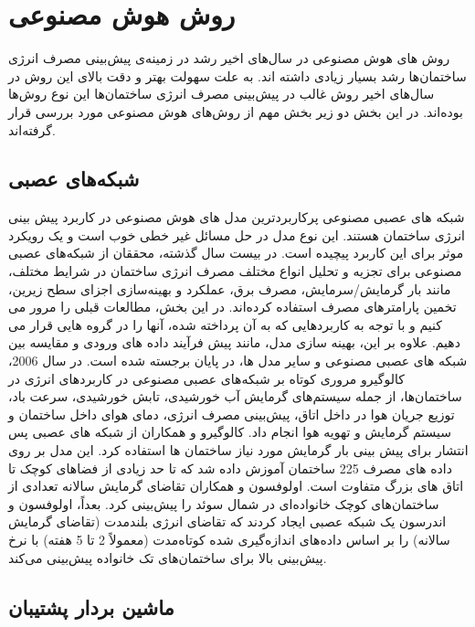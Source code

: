 \section{روش هوش مصنوعی}

روش های هوش مصنوعی در سال‌های اخیر رشد در زمینه‌ی پیش‌بینی مصرف انرژی ساختمان‌ها رشد بسیار زیادی داشته اند. به علت سهولت بهتر و دقت بالای این روش در سال‌های اخیر روش غالب در پیش‌بینی مصرف انرژی ساختمان‌ها این نوع روش‌ها بوده‌اند. 
در این بخش دو زیر بخش مهم از روش‌های هوش مصنوعی مورد بررسی قرار گرفته‌اند. 

\subsection{شبکه‌های عصبی\protect{}}

شبکه های عصبی مصنوعی پرکاربردترین مدل های هوش مصنوعی در کاربرد پیش بینی انرژی ساختمان هستند. این نوع مدل در حل مسائل غیر خطی خوب است و یک رویکرد موثر برای این کاربرد پیچیده است. در بیست سال گذشته، محققان از شبکه‌های عصبی مصنوعی برای تجزیه و تحلیل انواع مختلف مصرف انرژی ساختمان در شرایط مختلف، مانند بار گرمایش/سرمایش، مصرف برق، عملکرد و بهینه‌سازی اجزای سطح زیرین، تخمین پارامترهای مصرف استفاده کرده‌اند. در این بخش، مطالعات قبلی را مرور می کنیم و با توجه به کاربردهایی که به آن پرداخته شده، آنها را در گروه هایی قرار می دهیم. علاوه بر این، بهینه سازی مدل، مانند پیش فرآیند داده های ورودی و مقایسه بین شبکه های عصبی مصنوعی و سایر مدل ها، در پایان برجسته شده است. در سال 2006، کالوگیرو \cite{kalogirou1997building} مروری کوتاه بر شبکه‌های عصبی مصنوعی در کاربردهای انرژی در ساختمان‌ها، از جمله سیستم‌های گرمایش آب خورشیدی، تابش خورشیدی، سرعت باد، توزیع جریان هوا در داخل اتاق، پیش‌بینی مصرف انرژی، دمای هوای داخل ساختمان و سیستم گرمایش و تهویه هوا انجام داد.
کالوگیرو و همکاران \cite{kalogirou2006artificial} از شبکه های عصبی پس انتشار برای پیش بینی بار گرمایش مورد نیاز ساختمان ها استفاده کرد. این مدل بر روی داده های مصرف 225 ساختمان آموزش داده شد که تا حد زیادی از فضاهای کوچک تا اتاق های بزرگ متفاوت است. اولوفسون و همکاران \cite{olofsson1998method} تقاضای گرمایش سالانه تعدادی از ساختمان‌های کوچک خانواده‌ای در شمال سوئد را پیش‌بینی کرد. بعداً، اولوفسون و اندرسون\cite{olofsson2001long} یک شبکه عصبی ایجاد کردند که تقاضای انرژی بلندمدت (تقاضای گرمایش سالانه) را بر اساس داده‌های اندازه‌گیری شده کوتاه‌مدت (معمولاً 2 تا 5 هفته) با نرخ پیش‌بینی بالا برای ساختمان‌های تک خانواده پیش‌بینی می‌کند.


\subsection{ماشین بردار پشتیبان\protect{}}

